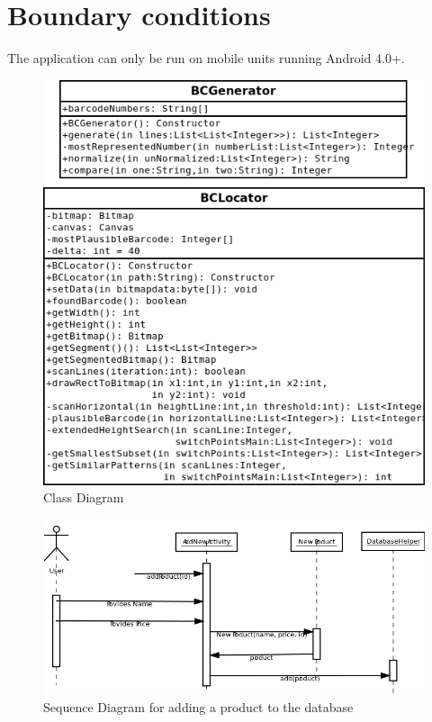 \documentclass{report}
\begin{document}
\section{Boundary conditions}
The application can only be run on mobile units running Android 4.0+.




\appendix

\pagebreak

\begin{figure}[H]
		\centering
		\includegraphics[width=\textwidth]{classdiagramcore.png}
		\caption{Class Diagram}
		\label{fig:Class Diagram for Core package.}
\end{figure}

\pagebreak

\begin{figure}[H]
		\centering
		\includegraphics[width=\textwidth]{sequencediagram.png}
		\caption{Sequence Diagram for adding a product to the database}
		\label{fig:Sequence Diagram.}
\end{figure}
\end{document}
